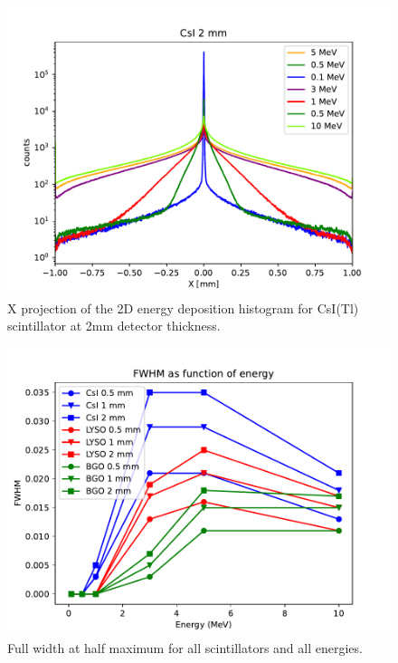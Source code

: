 \documentclass{article}
\begin{document}
\begin{figure}[H]
    \centering
    \includegraphics[width=\linewidth]{images/task4/CsI_2mm.pdf}
    \caption{X projection of the 2D energy deposition histogram for CsI(Tl) scintillator at 2mm detector thickness.}
\end{figure}


\begin{figure}[H]
    \centering
    \includegraphics[width=\linewidth]{images/task4/FWHM_all.pdf}
    \caption{Full width at half maximum for all scintillators and all energies.}
\end{figure}
\end{document}
